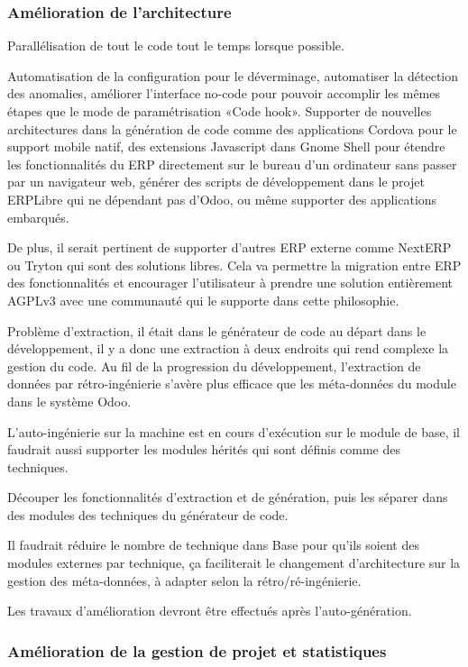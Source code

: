 \subsubsection{Amélioration de l’architecture}
Parallélisation de tout le code tout le temps lorsque possible.

Automatisation de la configuration pour le déverminage, automatiser la détection des anomalies, améliorer l’interface no-code pour pouvoir accomplir les mêmes étapes que le mode de paramétrisation «Code hook». Supporter de nouvelles architectures dans la génération de code comme des applications Cordova pour le support mobile natif, des extensions Javascript dans Gnome Shell pour étendre les fonctionnalités du ERP directement sur le bureau d’un ordinateur sans passer par un navigateur web, générer des scripts de développement dans le projet ERPLibre qui ne dépendant pas d’Odoo, ou même supporter des applications embarqués.

De plus, il serait pertinent de supporter d’autres ERP externe comme NextERP ou Tryton qui sont des solutions libres. Cela va permettre la migration entre ERP des fonctionnalités et encourager l’utilisateur à prendre une solution entièrement AGPLv3 avec une communauté qui le supporte dans cette philosophie.

Problème d’extraction, il était dans le générateur de code au départ dans le développement, il y a donc une extraction à deux endroits qui rend complexe la gestion du code. Au fil de la progression du développement, l’extraction de données par rétro-ingénierie s’avère plus efficace que les méta-données du module dans le système Odoo.

L’auto-ingénierie sur la machine est en cours d’exécution sur le module de base, il faudrait aussi supporter les modules hérités qui sont définis comme des techniques.

Découper les fonctionnalités d'extraction et de génération, puis les séparer dans des modules des techniques du générateur de code.

Il faudrait réduire le nombre de technique dans Base pour qu’ils soient des modules externes par technique, ça faciliterait le changement d’architecture sur la gestion des méta-données, à adapter selon la rétro/ré-ingénierie.


Les travaux d’amélioration devront être effectués après l’auto-génération.

\subsubsection{Amélioration de la gestion de projet et statistiques}

